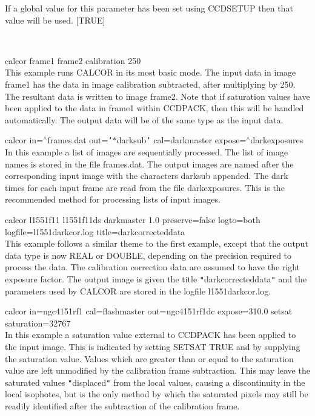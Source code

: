 \documentclass[twoside,11pt]{article}
\newcommand{\htmlref}[2]{#1}
\renewcommand{\_}{\texttt{\symbol{95}}}
\newcommand{\qt}[1]{{\tt "}#1{\tt "}}
\newcommand{\qs}[1]{{\tt '}#1{\tt '}}
\newcommand{\routine}[1]{{\sc #1}}
\newcommand{\xroutine}[1]{\htmlref{{\sc #1}}{#1}}
\newcommand{\sstexamples}[1]{
   \item[Examples:] \mbox{} \\
   \vspace{-3.5ex}
   \begin{description}
      #1
   \end{description}
}
\newcommand{\sstexamplesubsection}[2]{\sloppy \item{\ssttt #1} \mbox{} \\ #2 }
\newcommand{\sstnotes}[1]{\item[Notes:] \mbox{} \\[1.3ex] #1}
\newcommand{\sstitemlist}[1]{
  \mbox{} \\
  \vspace{-3.5ex}
  \begin{itemize}
     #1
  \end{itemize}
}
\newcommand{\sstexamples}[1]{
      \item[Examples:] \\
      \begin{description}
         #1
      \end{description}
      \\
   }
\newcommand{\sstexamplesubsection}[2]{\item[{\ssttt #1}] #2}
\newcommand{\sstnotes}[1]{\item[Notes:] #1 }
\newcommand{\sstitemlist}[1]{
      \begin{itemize}
         #1
      \end{itemize}
      \\
   }
\begin{document}
{{{         If a global value for this parameter has been set using 
         \xroutine{CCDSETUP} then that value will be used.
         [TRUE]
      }
   }
   \sstexamples{
      \sstexamplesubsection{
         calcor frame1 frame2 calibration 250
      } {
         This example runs \routine{CALCOR} in its most basic mode. The input data
         in image frame1 has the data in image calibration subtracted, after
         multiplying by 250. The resultant data is written to image
         frame2. Note that if saturation values have been applied to the
         data in frame1 within CCDPACK, then this will be handled
         automatically. The output data will be of the same type as the
         input data.
      }
      \sstexamplesubsection{
         calcor in=$^\wedge$frames.dat out=\qs{$*$\_darksub} cal=dark\_master
                expose=$^\wedge$dark\_exposures
      } {
         In this example a list of images are sequentially processed. The
         list of image names is stored in the file frames.dat. The output
         images are named after the corresponding input image with the
         characters \_darksub appended. The dark times for each input
         frame are read from the file dark\_exposures. This is the
         recommended method for processing lists of input images.
      }
      \sstexamplesubsection{
         calcor l1551\_f11 l1551\_f11\_ds dark\_master 1.0 preserve=false
             logto=both logfile=l1551\_darkcor.log
             title=dark\_corrected\_data
      } {
         This example follows a similar theme to the first example,
         except that the output data type is now \_REAL or \_DOUBLE,
         depending on the precision required to process the data. The
         calibration correction data are assumed to have the right
         exposure factor. The output image is given the title
         \qt{dark\_corrected\_data} and the parameters used by \routine{CALCOR}
         are
         stored in the logfile l1551\_darkcor.log.
      }
      \sstexamplesubsection{
         calcor in=ngc4151r\_f1 cal=flash\_master out=ngc4151r\_f1\_dc
             expose=310.0 setsat saturation=32767
      } {
         In this example a saturation value external to CCDPACK has
         been applied to the input image. This is indicated by setting
         SETSAT TRUE and by supplying the saturation value. Values
         which are greater than or equal to the saturation value are
         left unmodified by the calibration frame subtraction. This may
         leave the saturated values \qt{displaced} from the local values,
         causing a discontinuity in the local isophotes, but is the
         only method by which the saturated pixels may still be
         readily identified after the subtraction of the calibration
         frame.
      }
   }
   \sstnotes{
      \sstitemlist{

}}}
\end{document}
